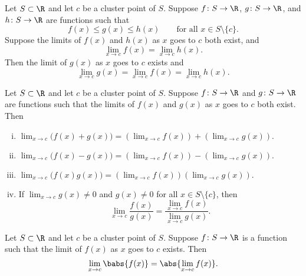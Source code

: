 \begin{cor} \label{fsqueeze:cor}
Let $S \subset \R$ and let $c$ be a cluster point of $S$.
Suppose $f \colon S \to \R$,
$g \colon S \to \R$, and $h \colon S \to \R$ are functions such that
\begin{equation*}
f(x) \leq g(x) \leq h(x) \qquad \text{for all } x \in S \setminus \{ c \}.
\end{equation*}
Suppose the limits of $f(x)$ and $h(x)$ as $x$ goes to $c$ both exist, and
\begin{equation*}
\lim_{x\to c} f(x) = \lim_{x\to c} h(x) .
\end{equation*}
Then the limit of $g(x)$ as $x$ goes to $c$ exists and
\begin{equation*}
\lim_{x\to c} g(x) =
\lim_{x\to c} f(x) = \lim_{x\to c} h(x) .
\end{equation*}
\end{cor}

\begin{cor} \label{falg:cor}
Let $S \subset \R$ and let $c$ be a cluster point of $S$.  
Suppose $f \colon S \to \R$ and
$g \colon S \to \R$ are functions
such that 
the limits of $f(x)$ and $g(x)$ as $x$ goes to $c$ both exist.
Then
\begin{enumerate}[(i)]
\item
$\displaystyle
\lim_{x\to c} \bigl(f(x)+g(x)\bigr) = \left(\lim_{x\to c} f(x)\right) + 
\left(\lim_{x\to c} g(x)\right) .
$
\item
$\displaystyle
\lim_{x\to c} \bigl(f(x)-g(x)\bigr) = \left(\lim_{x\to c} f(x)\right) -
\left(\lim_{x\to c} g(x)\right) .
$
\item
$\displaystyle
\lim_{x\to c} \bigl(f(x)g(x)\bigr) = \left(\lim_{x\to c} f(x)\right)
\left(\lim_{x\to c} g(x)\right) .
$
\item \label{falg:cor:iv} If
$\displaystyle \lim_{x\to c} g(x) \not= 0$
and $g(x) \not= 0$ for all $x \in S \setminus \{ c \}$, then
\begin{equation*}
\lim_{x\to c} \frac{f(x)}{g(x)} =
\frac{\lim_{x\to c} f(x)}{\lim_{x\to c} g(x)} .
\end{equation*}
\end{enumerate}
\end{cor}

\begin{cor} \label{fabs:cor}
Let $S \subset \R$ and let $c$ be a cluster point of $S$.
Suppose $f \colon S \to \R$ is a function such that the limit of $f(x)$ as $x$ goes to $c$
exists.
Then
\begin{equation*}
\lim_{x\to c} \babs{f(x)} =
\abs{\lim_{x\to c} f(x)}.
\end{equation*}
\end{cor}

